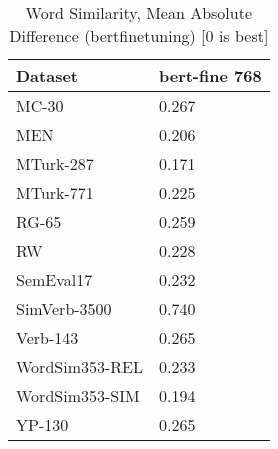 \begin{table}[]
\centering
\begin{tabular}{l|l}
\hline
Dataset & bert-fine 768 \\
\hline
MC-30 & 0.267 \\ 
MEN & 0.206 \\ 
MTurk-287 & 0.171 \\ 
MTurk-771 & 0.225 \\ 
RG-65 & 0.259 \\ 
RW & 0.228 \\ 
SemEval17 & 0.232 \\ 
SimVerb-3500 & 0.740 \\ 
Verb-143 & 0.265 \\ 
WordSim353-REL & 0.233 \\ 
WordSim353-SIM & 0.194 \\ 
YP-130 & 0.265
\end{tabular}
\caption{Word Similarity, Mean Absolute Difference (bertfinetuning) [0 is best]}
\label{tab:similarity-bertfinetuning}
\end{table}
